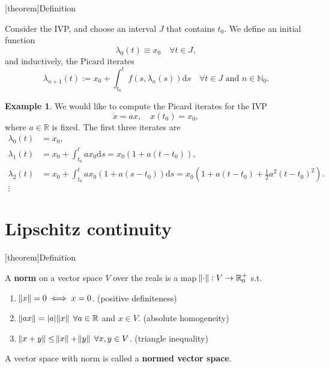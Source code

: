 \documentclass[12pt]{report}
\theoremstyle{definition}
\begin{document}
[theorem]{Definition}
\begin{Picard iterates}
    Consider the IVP, and choose an interval $J$ that contains $t_0$.
    We define an initial function
    \[
        \lambda_0(t)\equiv x_0\quad\forall t\in J,
    \]
    and inductively, the Picard iterates
    \[
        \lambda_{n+1}(t):=x_0+\int_{t_0}^{t}f(s,\lambda_n(s))\mathrm{d}s
        \quad\forall t\in J \text{ and } n\in\mathbb{N}_0.
    \]
\end{Picard iterates}

\newtheorem{picard iterates example}[theorem]{Example}
\begin{picard iterates example}
    We would like to compute the Picard iterates for the IVP
    \[
        \dot{x}=ax, \quad x(t_{0})=x_0,
    \]
    where $a\in\mathbb{R}$ is fixed. The first three iterates are
    \begin{align*}
        \lambda_0(t) & = x_0, \\
        \lambda_1(t) & = x_0 + \int_{t_0}^{t} ax_0\mathrm{d}s
        = x_0(1+a(t-t_0)), \\
        \lambda_2(t) & =x_0+\int_{t_0}^{t}ax_0(1+a(s-t_0))\mathrm{d}s
        = x_0(1+a(t-t_0)+\frac{1}{2}a^{2}(t-t_0)^{2}). \\
        \vdots
    \end{align*}
\end{picard iterates example}

\section{Lipschitz continuity}

[theorem]{Definition}
\begin{normed vector space}
    A \textbf{norm} on a vector space $V$ over the reals is a map
    $\norm{\cdot}:V\rightarrow\mathbb{R}_0^{+}$ s.t.
    \begin{enumerate}[label = (\roman*)]
        \item $\norm{x}=0 \iff x=0$. 
                (positive definiteness)
        \item $\norm{ax}=|a| \norm{x} \;\forall a\in\mathbb{R}$ and $x\in V$. 
            (absolute homogeneity)
        \item $\norm{x+y}\le\norm{x}+\norm{y} \;\forall x,y\in V$. 
            (triangle inequality)
    \end{enumerate} 
    A vector space with norm is called a \textbf{normed vector space}.
\end{normed vector space}
\end{document}
